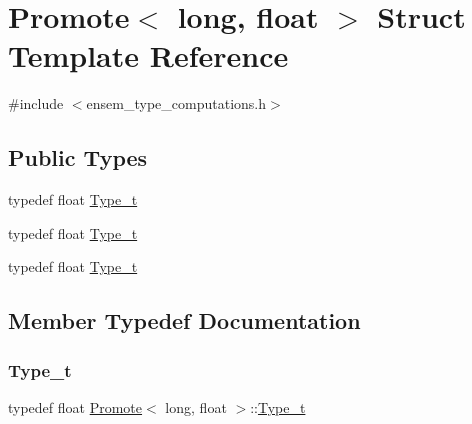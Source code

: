 \hypertarget{structPromote_3_01long_00_01float_01_4}{}\section{Promote$<$ long, float $>$ Struct Template Reference}
\label{structPromote_3_01long_00_01float_01_4}


{\ttfamily \#include $<$ensem\+\_\+type\+\_\+computations.\+h$>$}

\subsection*{Public Types}
\begin{DoxyCompactItemize}
\item 
typedef float \mbox{\hyperlink{structPromote_3_01long_00_01float_01_4_adf8f8e314d4cc953a8bec5fad1b5a495}{Type\+\_\+t}}
\item 
typedef float \mbox{\hyperlink{structPromote_3_01long_00_01float_01_4_adf8f8e314d4cc953a8bec5fad1b5a495}{Type\+\_\+t}}
\item 
typedef float \mbox{\hyperlink{structPromote_3_01long_00_01float_01_4_adf8f8e314d4cc953a8bec5fad1b5a495}{Type\+\_\+t}}
\end{DoxyCompactItemize}


\subsection{Member Typedef Documentation}
\mbox{\label{structPromote_3_01long_00_01float_01_4_adf8f8e314d4cc953a8bec5fad1b5a495}} 
\subsubsection{\texorpdfstring{Type\_t}{Type\_t}\hspace{0.1cm}{\footnotesize\ttfamily [1/3]}}
{\footnotesize\ttfamily typedef float \mbox{\hyperlink{structPromote}{Promote}}$<$ long, float $>$\+::\mbox{\hyperlink{structPromote_3_01long_00_01float_01_4_adf8f8e314d4cc953a8bec5fad1b5a495}{Type\+\_\+t}}}

\mbox{\label{structPromote_3_01long_00_01float_01_4_adf8f8e314d4cc953a8bec5fad1b5a495}} 
